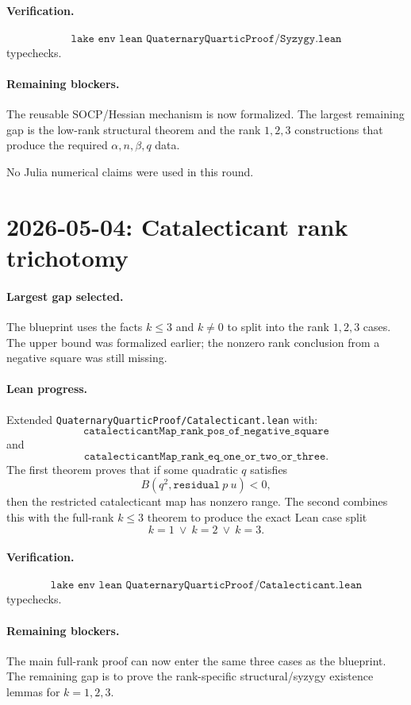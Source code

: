\documentclass[11pt]{article}
\begin{document}
\paragraph{Verification.}
\[
\texttt{lake env lean QuaternaryQuarticProof/Syzygy.lean}
\]
typechecks.

\paragraph{Remaining blockers.}
The reusable SOCP/Hessian mechanism is now formalized.  The largest remaining
gap is the low-rank structural theorem and the rank \(1,2,3\) constructions
that produce the required \(\alpha,n,\beta,q\) data.

No Julia numerical claims were used in this round.

\section*{2026-05-04: Catalecticant rank trichotomy}

\paragraph{Largest gap selected.}
The blueprint uses the facts \(k\le3\) and \(k\ne0\) to split into the
rank \(1,2,3\) cases.  The upper bound was formalized earlier; the nonzero
rank conclusion from a negative square was still missing.

\paragraph{Lean progress.}
Extended \texttt{QuaternaryQuarticProof/Catalecticant.lean} with:
\[
\texttt{catalecticantMap\_rank\_pos\_of\_negative\_square}
\]
and
\[
\texttt{catalecticantMap\_rank\_eq\_one\_or\_two\_or\_three}.
\]
The first theorem proves that if some quadratic \(q\) satisfies
\[
B(q^2,\texttt{residual}\ p\ u)<0,
\]
then the restricted catalecticant map has nonzero range.  The second combines
this with the full-rank \(k\le3\) theorem to produce the exact Lean case split
\[
k=1\ \vee\ k=2\ \vee\ k=3.
\]

\paragraph{Verification.}
\[
\texttt{lake env lean QuaternaryQuarticProof/Catalecticant.lean}
\]
typechecks.

\paragraph{Remaining blockers.}
The main full-rank proof can now enter the same three cases as the blueprint.
The remaining gap is to prove the rank-specific structural/syzygy existence
lemmas for \(k=1,2,3\).
\end{document}
